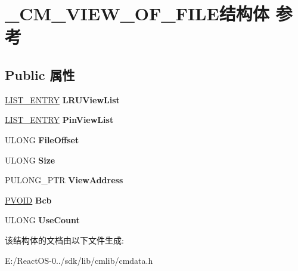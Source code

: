 \hypertarget{struct___c_m___v_i_e_w___o_f___f_i_l_e}{}\section{\+\_\+\+C\+M\+\_\+\+V\+I\+E\+W\+\_\+\+O\+F\+\_\+\+F\+I\+L\+E结构体 参考}
\label{struct___c_m___v_i_e_w___o_f___f_i_l_e}
\subsection*{Public 属性}
\begin{DoxyCompactItemize}
\item 
\mbox{\label{struct___c_m___v_i_e_w___o_f___f_i_l_e_a5b2f6c3b7ffb159c793f14a3a30728ca}} 
\hyperlink{struct___l_i_s_t___e_n_t_r_y}{L\+I\+S\+T\+\_\+\+E\+N\+T\+RY} {\bfseries L\+R\+U\+View\+List}
\item 
\mbox{\label{struct___c_m___v_i_e_w___o_f___f_i_l_e_a9f80e801d97d35d41110b7e88647f400}} 
\hyperlink{struct___l_i_s_t___e_n_t_r_y}{L\+I\+S\+T\+\_\+\+E\+N\+T\+RY} {\bfseries Pin\+View\+List}
\item 
\mbox{\label{struct___c_m___v_i_e_w___o_f___f_i_l_e_a8088a41383e1adce9e46b7d5858c514d}} 
U\+L\+O\+NG {\bfseries File\+Offset}
\item 
\mbox{\label{struct___c_m___v_i_e_w___o_f___f_i_l_e_abd46faaf206ca7375f3e835f9b4a036b}} 
U\+L\+O\+NG {\bfseries Size}
\item 
\mbox{\label{struct___c_m___v_i_e_w___o_f___f_i_l_e_a9052531b099b018ded49e83a05d5a0f5}} 
P\+U\+L\+O\+N\+G\+\_\+\+P\+TR {\bfseries View\+Address}
\item 
\mbox{\label{struct___c_m___v_i_e_w___o_f___f_i_l_e_a873f25c78e6a09f027d6ea8e3115592d}} 
\hyperlink{interfacevoid}{P\+V\+O\+ID} {\bfseries Bcb}
\item 
\mbox{\label{struct___c_m___v_i_e_w___o_f___f_i_l_e_ab8cedd2bb2a4b5473259821d5bd7225f}} 
U\+L\+O\+NG {\bfseries Use\+Count}
\end{DoxyCompactItemize}


该结构体的文档由以下文件生成\+:\begin{DoxyCompactItemize}
\item 
E\+:/\+React\+O\+S-\/0../sdk/lib/cmlib/cmdata.\+h\end{DoxyCompactItemize}
